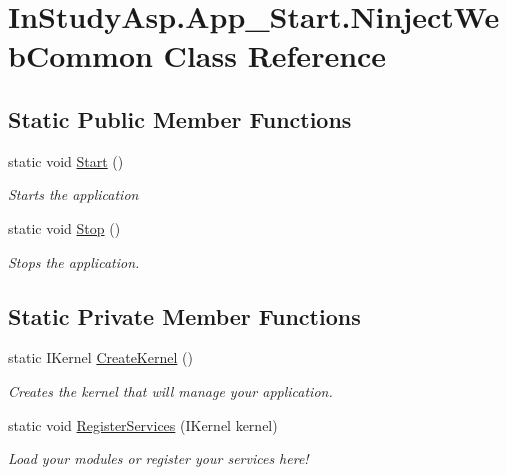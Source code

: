 \hypertarget{class_in_study_asp_1_1_app___start_1_1_ninject_web_common}{}\section{In\+Study\+Asp.\+App\+\_\+\+Start.\+Ninject\+Web\+Common Class Reference}
\label{class_in_study_asp_1_1_app___start_1_1_ninject_web_common}
\subsection*{Static Public Member Functions}
\begin{DoxyCompactItemize}
\item 
static void \hyperlink{class_in_study_asp_1_1_app___start_1_1_ninject_web_common_a5f2fd0336cc58d1bff7e9bacaf3dac0f}{Start} ()
\begin{DoxyCompactList}\small\item\em Starts the application \end{DoxyCompactList}\item 
static void \hyperlink{class_in_study_asp_1_1_app___start_1_1_ninject_web_common_a61ec74f8d4223f5fa02c43d6cd92559c}{Stop} ()
\begin{DoxyCompactList}\small\item\em Stops the application. \end{DoxyCompactList}\end{DoxyCompactItemize}
\subsection*{Static Private Member Functions}
\begin{DoxyCompactItemize}
\item 
static I\+Kernel \hyperlink{class_in_study_asp_1_1_app___start_1_1_ninject_web_common_ada95e960047d598b69e9aac859977a35}{Create\+Kernel} ()
\begin{DoxyCompactList}\small\item\em Creates the kernel that will manage your application. \end{DoxyCompactList}\item 
static void \hyperlink{class_in_study_asp_1_1_app___start_1_1_ninject_web_common_a6ef77a66355b50bbe2f357776e14ffa1}{Register\+Services} (I\+Kernel kernel)
\begin{DoxyCompactList}\small\item\em Load your modules or register your services here! \end{DoxyCompactList}\end{DoxyCompactItemize}
